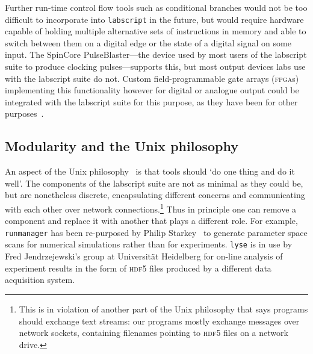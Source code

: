 Further run-time control flow tools such as conditional branches would not be too difficult to incorporate into \texttt{labscript} in the future, but would require hardware capable of holding multiple alternative sets of instructions in memory and able to switch between them on a digital edge or the state of a digital signal on some input. The SpinCore PulseBlaster---the device used by most users of the labscript suite to produce clocking pulses---supports this, but most output devices labs use with the labscript suite do not. Custom field-programmable gate arrays (\textsc{fpga}s) implementing this functionality however for digital or analogue output could be integrated with the labscript suite for this purpose, as they have been for other purposes~\cite{gill_optical_2016}.

\subsection{Modularity and the Unix philosophy}\label{sec:unix_philosophy}

An aspect of the Unix philosophy~\cite{gancarz_unix_1995} is that tools should `do one thing and do it well'. The components of the labscript suite are not as minimal as they could be, but are nonetheless discrete, encapsulating different concerns and communicating with each other over network connections.\footnote{This is in violation of another part of the Unix philosophy that says programs should exchange text streams: our programs mostly exchange messages over network sockets, containing filenames pointing to \textsc{hdf5} files on a network drive.} Thus in principle one can remove a component and replace it with another that plays a different role. For example, \texttt{runmanager} has been re-purposed by Philip Starkey~\cite{starkey_thesis_2018} to generate parameter space scans for numerical simulations rather than for experiments. \texttt{lyse} is in use by Fred Jendrzejewski's group at Universit\"at Heidelberg for on-line analysis of experiment results in the form of \textsc{hdf5} files produced by a different data acquisition system.

